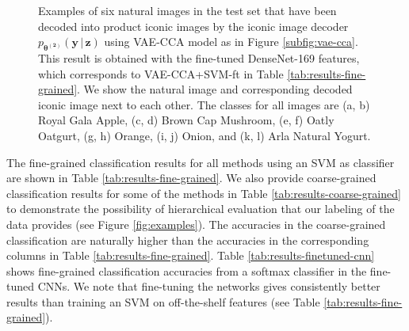 \begin{figure}[t]
\begin{subfigure}[b]{0.14\textwidth}
		\caption{}
		\label{subfig:yogurt-decoded}
	\end{subfigure}
	\vspace{-2mm}
	\caption{ 
	Examples of six natural images in the test set that have been decoded into product iconic images by the iconic image decoder $p_{\boldsymbol{\theta^{(2)}}}(\mathbf{y}\,|\,\mathbf{z})$ using VAE-CCA model as in Figure \ref{subfig:vae-cca}. This result is obtained with the fine-tuned DenseNet-169 features, which corresponds to VAE-CCA+SVM-ft in Table \ref{tab:results-fine-grained}. 
	We show the natural image and corresponding decoded iconic image next to each other. The classes for all images are (a, b) Royal Gala Apple, (c, d) Brown Cap Mushroom, (e, f) Oatly Oatgurt, (g, h) Orange, (i, j) Onion, and (k, l) Arla Natural Yogurt.
	} 
	\label{fig:decoded-images}
	\vspace{-3mm}
\end{figure}



The fine-grained classification results for all methods using an SVM as classifier are shown in Table \ref{tab:results-fine-grained}. We also provide coarse-grained classification results for some of the methods in Table \ref{tab:results-coarse-grained} to demonstrate the possibility of hierarchical evaluation that our labeling of the data provides (see Figure \ref{fig:examples}). The accuracies in the coarse-grained classification are naturally higher than the accuracies in the corresponding columns in Table \ref{tab:results-fine-grained}. Table \ref{tab:results-finetuned-cnn} shows fine-grained classification accuracies from a softmax classifier in the fine-tuned CNNs. We note that fine-tuning the networks gives consistently better results than training an SVM on off-the-shelf features (see Table \ref{tab:results-fine-grained}).


